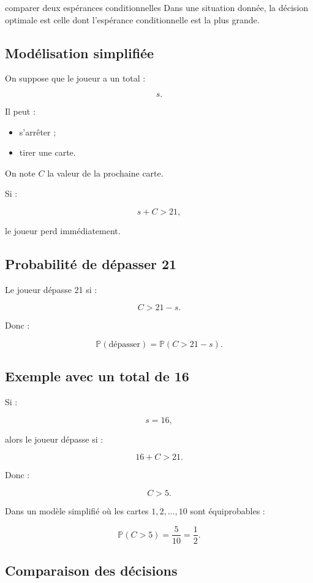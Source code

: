 \documentclass[11pt,a4paper]{article}
\newcommand{\Prob}{\mathbb{P}}
\begin{document}
\begin{idee}{comparer deux espérances conditionnelles}
Dans une situation donnée, la décision optimale est celle dont l'espérance conditionnelle est la plus grande.
\end{idee}

\subsection{Modélisation simplifiée}

On suppose que le joueur a un total :

\[
s.
\]

Il peut :
\begin{itemize}
    \item s'arrêter ;
    \item tirer une carte.
\end{itemize}

On note $C$ la valeur de la prochaine carte.

Si :

\[
s+C>21,
\]

le joueur perd immédiatement.

\subsection{Probabilité de dépasser 21}

Le joueur dépasse 21 si :

\[
C>21-s.
\]

Donc :

\[
\Prob(\text{dépasser})=\Prob(C>21-s).
\]

\subsection{Exemple avec un total de 16}

Si :

\[
s=16,
\]

alors le joueur dépasse si :

\[
16+C>21.
\]

Donc :

\[
C>5.
\]

Dans un modèle simplifié où les cartes $1,2,\dots,10$ sont équiprobables :

\[
\Prob(C>5)=\frac{5}{10}=\frac12.
\]

\subsection{Comparaison des décisions}
\end{document}
